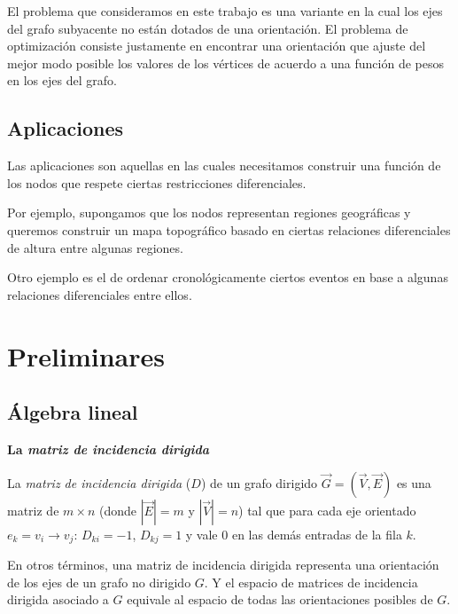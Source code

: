 \documentclass[conference,compsoc,a4paper]{IEEEtran}
\begin{document}
\bigskip

El problema que consideramos en este trabajo es una variante en la 
cual los ejes del grafo subyacente no están dotados de una orientación. 
El problema de optimización consiste justamente en encontrar una 
orientación que ajuste del mejor modo posible los valores de los 
vértices de acuerdo a una función de pesos en los ejes del grafo.


\subsection{Aplicaciones}

Las aplicaciones son aquellas en las cuales necesitamos construir una 
función de los nodos que respete ciertas restricciones diferenciales.

Por ejemplo, supongamos que los nodos representan regiones geográficas 
y queremos construir un mapa topográfico basado en ciertas relaciones 
diferenciales de altura entre algunas regiones.

Otro ejemplo es el de ordenar cronológicamente ciertos eventos 
en base a algunas relaciones diferenciales entre ellos.

\section{Preliminares}

\subsection{Álgebra lineal}

\textbf{La \textit{matriz de incidencia dirigida}}

\smallskip

La \textit{matriz de incidencia dirigida} ($D$) de un grafo dirigido 
$\vec G = (\vec V, \vec E)$ es una matriz de $m \times n$ (donde $|\vec
 E| = m$ y $|\vec V| = n$) tal que para cada eje orientado 
$e_k=v_i \rightarrow v_j$: $D_{ki} = -1$, $D_{kj} = 1$ y vale $0$ en 
las demás entradas de la fila $k$.

\smallskip

En otros términos, una matriz de incidencia dirigida representa una 
 orientación de los ejes de un grafo no dirigido $G$. Y el 
espacio de matrices de incidencia dirigida asociado a $G$ 
equivale al espacio de todas las orientaciones posibles de $G$.

\bigskip

\end{document}
